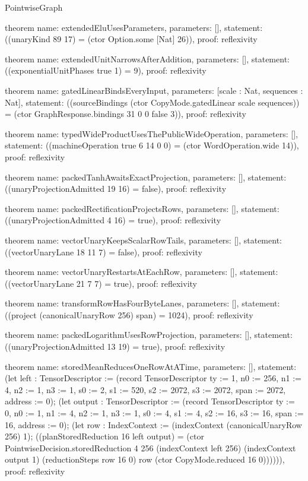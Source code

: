 \begin{lexlean}{PointwiseGraph}
\begin{semanticmodule}
theorem{
  name: extendedEluUsesParameters,
  parameters: [],
  statement: ((unaryKind 89 17) = (ctor Option.some [Nat] 26)),
  proof: reflexivity{}
}

theorem{
  name: extendedUnitNarrowsAfterAddition,
  parameters: [],
  statement: ((exponentialUnitPhases true 1) = 9),
  proof: reflexivity{}
}

theorem{
  name: gatedLinearBindsEveryInput,
  parameters: [scale : Nat, sequences : Nat],
  statement: ((sourceBindings (ctor CopyMode.gatedLinear scale sequences)) = (ctor GraphResponse.bindings 31 0 0 false 3)),
  proof: reflexivity{}
}

theorem{
  name: typedWideProductUsesThePublicWideOperation,
  parameters: [],
  statement: ((machineOperation true 6 14 0 0) = (ctor WordOperation.wide 14)),
  proof: reflexivity{}
}

theorem{
  name: packedTanhAwaitsExactProjection,
  parameters: [],
  statement: ((unaryProjectionAdmitted 19 16) = false),
  proof: reflexivity{}
}

theorem{
  name: packedRectificationProjectsRows,
  parameters: [],
  statement: ((unaryProjectionAdmitted 4 16) = true),
  proof: reflexivity{}
}

theorem{
  name: vectorUnaryKeepsScalarRowTails,
  parameters: [],
  statement: ((vectorUnaryLane 18 11 7) = false),
  proof: reflexivity{}
}

theorem{
  name: vectorUnaryRestartsAtEachRow,
  parameters: [],
  statement: ((vectorUnaryLane 21 7 7) = true),
  proof: reflexivity{}
}

theorem{
  name: transformRowHasFourByteLanes,
  parameters: [],
  statement: ((project (canonicalUnaryRow 256) span) = 1024),
  proof: reflexivity{}
}

theorem{
  name: packedLogarithmUsesRowProjection,
  parameters: [],
  statement: ((unaryProjectionAdmitted 13 19) = true),
  proof: reflexivity{}
}

theorem{
  name: storedMeanReducesOneRowAtATime,
  parameters: [],
  statement: (let left : TensorDescriptor := (record TensorDescriptor {ty := 1, n0 := 256, n1 := 4, n2 := 1, n3 := 1, s0 := 2, s1 := 520, s2 := 2072, s3 := 2072, span := 2072, address := 0}); (let output : TensorDescriptor := (record TensorDescriptor {ty := 0, n0 := 1, n1 := 4, n2 := 1, n3 := 1, s0 := 4, s1 := 4, s2 := 16, s3 := 16, span := 16, address := 0}); (let row : IndexContext := (indexContext (canonicalUnaryRow 256) 1); ((planStoredReduction 16 left output) = (ctor PointwiseDecision.storedReduction 4 256 (indexContext left 256) (indexContext output 1) (reductionSteps row 16 0) row (ctor CopyMode.reduced 16 0)))))),
  proof: reflexivity{}
}


\end{semanticmodule}
\end{lexlean}
